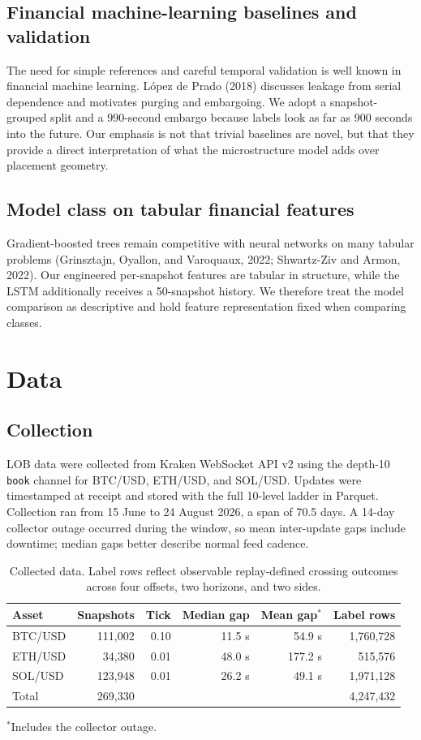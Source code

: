 \documentclass[11pt]{article}
\begin{document}
\subsection{Financial machine-learning baselines and validation}
The need for simple references and careful temporal validation is well known in financial machine learning. López de Prado (2018) discusses leakage from serial dependence and motivates purging and embargoing. We adopt a snapshot-grouped split and a 990-second embargo because labels look as far as 900 seconds into the future. Our emphasis is not that trivial baselines are novel, but that they provide a direct interpretation of what the microstructure model adds over placement geometry.

\subsection{Model class on tabular financial features}
Gradient-boosted trees remain competitive with neural networks on many tabular problems (Grinsztajn, Oyallon, and Varoquaux, 2022; Shwartz-Ziv and Armon, 2022). Our engineered per-snapshot features are tabular in structure, while the LSTM additionally receives a 50-snapshot history. We therefore treat the model comparison as descriptive and hold feature representation fixed when comparing classes.

\section{Data}
\subsection{Collection}
LOB data were collected from Kraken WebSocket API v2 using the depth-10 \texttt{book} channel for BTC/USD, ETH/USD, and SOL/USD. Updates were timestamped at receipt and stored with the full 10-level ladder in Parquet. Collection ran from 15 June to 24 August 2026, a span of 70.5 days. A 14-day collector outage occurred during the window, so mean inter-update gaps include downtime; median gaps better describe normal feed cadence.

\begin{table}[ht]
\centering
\caption{Collected data. Label rows reflect observable replay-defined crossing outcomes across four offsets, two horizons, and two sides.}
\begin{tabular}{lrrrrr}
\toprule
Asset & Snapshots & Tick & Median gap & Mean gap$^{*}$ & Label rows \\
\midrule
BTC/USD & 111,002 & 0.10 & 11.5 s & 54.9 s & 1,760,728 \\
ETH/USD & 34,380 & 0.01 & 48.0 s & 177.2 s & 515,576 \\
SOL/USD & 123,948 & 0.01 & 26.2 s & 49.1 s & 1,971,128 \\
\midrule
Total & 269,330 & & & & 4,247,432 \\
\bottomrule
\end{tabular}

\smallskip
{\footnotesize $^{*}$Includes the collector outage.}
\end{table}
\end{document}
